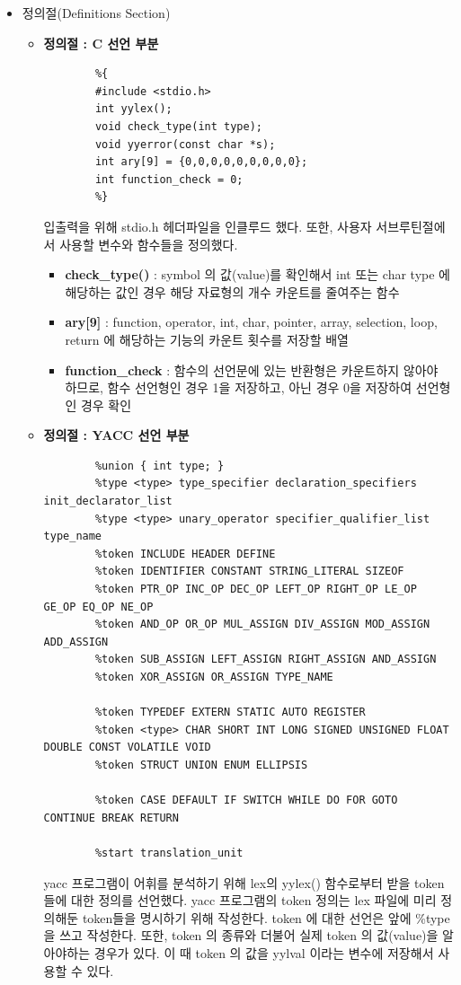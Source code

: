 \documentclass{article}
\begin{document}
\begin{itemize}
	\item 정의절(Definitions Section)	
	\begin{itemize}
		\item {\bf 정의절 : C 선언 부분}
		\begin{lstlisting}
		%{
		#include <stdio.h>
		int yylex();
		void check_type(int type);
		void yyerror(const char *s);
		int ary[9] = {0,0,0,0,0,0,0,0,0};
		int function_check = 0;
		%}
		\end{lstlisting}
		입출력을 위해 stdio.h 헤더파일을 인클루드 했다.
		또한, 사용자 서브루틴절에서 사용할 변수와 함수들을 정의했다.
		\begin{itemize}
			\item {\bf check\_type()} : symbol 의 값(value)를 확인해서
			int 또는 char type 에 해당하는 값인 경우 해당 자료형의 개수 카운트를 줄여주는 함수
			\item {\bf ary[9]} : function, operator, int, char, pointer, array, selection,
			loop, return 에 해당하는 기능의 카운트 횟수를 저장할 배열
			\item {\bf function\_check} : 함수의 선언문에 있는 반환형은 카운트하지 않아야 하므로,
			함수 선언형인 경우 1을 저장하고, 아닌 경우 0을 저장하여 선언형인 경우 확인
		\end{itemize}

		\item {\bf 정의절 : YACC 선언 부분}
		\begin{lstlisting}
		%union { int type; }
		%type <type> type_specifier declaration_specifiers init_declarator_list
		%type <type> unary_operator specifier_qualifier_list type_name
		%token INCLUDE HEADER DEFINE
		%token IDENTIFIER CONSTANT STRING_LITERAL SIZEOF
		%token PTR_OP INC_OP DEC_OP LEFT_OP RIGHT_OP LE_OP GE_OP EQ_OP NE_OP
		%token AND_OP OR_OP MUL_ASSIGN DIV_ASSIGN MOD_ASSIGN ADD_ASSIGN
		%token SUB_ASSIGN LEFT_ASSIGN RIGHT_ASSIGN AND_ASSIGN
		%token XOR_ASSIGN OR_ASSIGN TYPE_NAME
		
		%token TYPEDEF EXTERN STATIC AUTO REGISTER
		%token <type> CHAR SHORT INT LONG SIGNED UNSIGNED FLOAT DOUBLE CONST VOLATILE VOID
		%token STRUCT UNION ENUM ELLIPSIS
		
		%token CASE DEFAULT IF SWITCH WHILE DO FOR GOTO CONTINUE BREAK RETURN
		
		%start translation_unit
		\end{lstlisting}
		yacc 프로그램이 어휘를 분석하기 위해 lex의 yylex() 함수로부터 받을 token 들에 대한 정의를 선언했다.
		yacc 프로그램의 token 정의는 lex 파일에 미리 정의해둔 token들을 명시하기 위해 작성한다.
		token 에 대한 선언은 앞에 \%type을 쓰고 작성한다. 또한, token 의 종류와 더불어 실제 token 의 값(value)을
		알아야하는 경우가 있다. 이 때 token 의 값을 yylval 이라는 변수에 저장해서 사용할 수 있다. 


\end{itemize}
\end{itemize}
\end{document}
